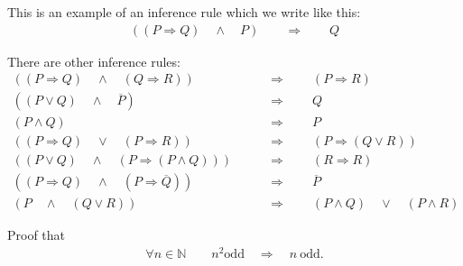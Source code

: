 This is an example of an inference rule which we write like this:
\begin{align*}
((P \Rightarrow Q) \quad \wedge \quad P) \qquad \Rightarrow \qquad Q
\end{align*}

There are other inference rules:
\begin{align*}
\left(\left(P \Rightarrow Q\right) \quad \wedge \quad \left(Q \Rightarrow R\right)\right) \qquad & \Rightarrow \qquad \left(P \Rightarrow R\right) \\
\left(\left(P \vee Q\right) \quad \wedge \quad \overline P \right) \qquad & \Rightarrow \qquad Q \\
\left(P \wedge Q\right)  \qquad &  \Rightarrow \qquad P \\
\left(\left(P \Rightarrow Q\right) \quad \vee \quad \left(P \Rightarrow R\right)\right)  \qquad &  \Rightarrow \qquad (P \Rightarrow \left(Q \vee R\right)) \\
\left(\left(P \vee Q\right) \quad \wedge \quad \left(P \Rightarrow \left(P \wedge Q\right)\right)\right)  \qquad &  \Rightarrow \qquad \left(R  \Rightarrow R\right) \\
\left(\left(P \Rightarrow Q\right) \quad \wedge \quad \left(P \Rightarrow \overline Q\right)\right) \qquad &  \Rightarrow  \qquad \overline{P} \\
(P \quad \wedge \quad (Q \vee R)) \qquad &  \Rightarrow \qquad  (P \wedge Q) \quad \vee \quad (P \wedge R)
\end{align*}

\begin{ec}
 Proof that 
\begin{align*}
\forall n \in \mathbb N \qquad n^2 \text{odd} \quad \Rightarrow \quad n~ \text{odd}  .
\end{align*}
\end{ec}

